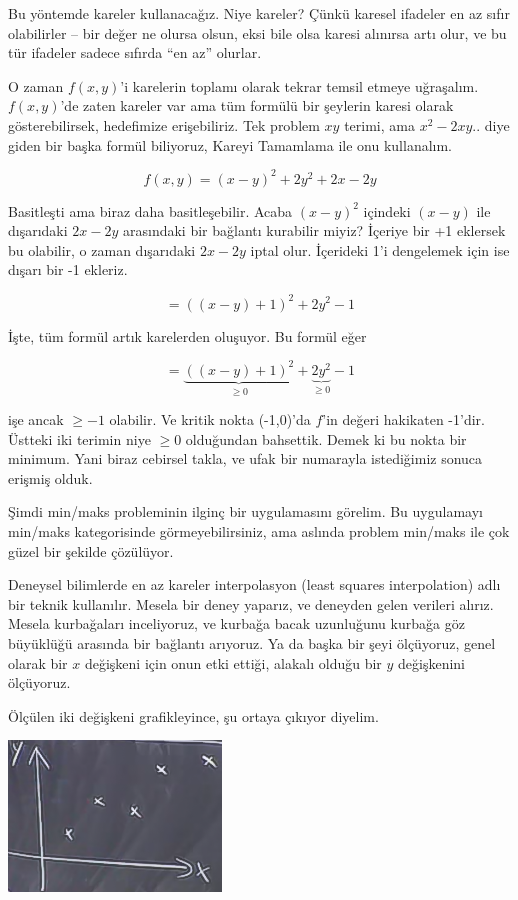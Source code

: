 \documentclass[12pt,fleqn]{article}\usepackage{../../common}
\begin{document}
Bu yöntemde kareler kullanacağız. Niye kareler? Çünkü karesel ifadeler en
az sıfır olabilirler -- bir değer ne olursa olsun, eksi bile olsa karesi
alınırsa artı olur, ve bu tür ifadeler sadece sıfırda ``en az'' olurlar.

O zaman $f(x,y)$'i karelerin toplamı olarak tekrar temsil etmeye
uğraşalım. $f(x,y)$'de zaten kareler var ama tüm formülü bir şeylerin
karesi olarak gösterebilirsek, hedefimize erişebiliriz. Tek problem $xy$
terimi, ama $x^2 - 2xy..$ diye giden bir başka formül biliyoruz, Kareyi
Tamamlama ile onu kullanalım.

$$ f(x,y) = (x-y)^2 + 2y^2 + 2x - 2y $$

Basitleşti ama biraz daha basitleşebilir. Acaba $(x-y)^2$ içindeki $(x-y)$
ile dışarıdaki $2x - 2y$ arasındaki bir bağlantı kurabilir miyiz? İçeriye
bir +1 eklersek bu olabilir, o zaman dışarıdaki $2x - 2y$ iptal
olur. İçerideki 1'i dengelemek için ise dışarı bir -1 ekleriz.

$$  = ((x-y) + 1)^2 + 2y^2 - 1$$

İşte, tüm formül artık karelerden oluşuyor. Bu formül eğer 

$$  = \underbrace{((x-y) + 1)^2}_{\ge 0} + \underbrace{2y^2}_{\ge 0} - 1$$

işe ancak $\ge -1$ olabilir. Ve kritik nokta (-1,0)'da $f$'in değeri hakikaten
-1'dir. Üstteki iki terimin niye $\ge 0$ olduğundan bahsettik. Demek ki bu nokta
bir minimum.  Yani biraz cebirsel takla, ve ufak bir numarayla istediğimiz
sonuca erişmiş olduk.

Şimdi min/maks probleminin ilginç bir uygulamasını görelim. Bu uygulamayı
min/maks kategorisinde görmeyebilirsiniz, ama aslında problem min/maks ile
çok güzel bir şekilde çözülüyor.

Deneysel bilimlerde en az kareler interpolasyon (least squares interpolation)
adlı bir teknik kullanılır. Mesela bir deney yaparız, ve deneyden gelen verileri
alırız. Mesela kurbağaları inceliyoruz, ve kurbağa bacak uzunluğunu kurbağa göz
büyüklüğü arasında bir bağlantı arıyoruz. Ya da başka bir şeyi ölçüyoruz, genel
olarak bir $x$ değişkeni için onun etki ettiği, alakalı olduğu bir $y$
değişkenini ölçüyoruz.

Ölçülen iki değişkeni grafikleyince, şu ortaya çıkıyor diyelim.

\includegraphics[height=4cm]{9_5.png}
\end{document}
